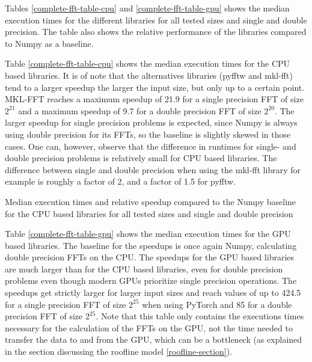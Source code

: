 \documentclass[english,11pt,a4paper,table]{article} %
\begin{document}
Tables \ref{complete-fft-table-cpu} and \ref{complete-fft-table-gpu} shows the median execution times for the different libraries for all tested sizes and single and double precision.
The table also shows the relative performance of the libraries compared to Numpy as a baseline.

Table \ref{complete-fft-table-cpu} shows the median execution times for the CPU based libraries.
It is of note that the alternatives libraries (pyfftw and mkl-fft) tend to a larger speedup the larger the input size, but only up to a certain point.
MKL-FFT reaches a maximum speedup of 21.9 for a single precision FFT of size $2^{21}$ and a maximum speedup of 9.7 for a double precision FFT of size $2^{20}$.
The larger speedup for single precision problems is expected, since Numpy is always using double precision for its FFTs, so the baseline is slightly skewed in those cases.
One can, however, observe that the difference in runtimes for single- and double precision problems is relatively small for CPU based libraries.
The difference between single and double precision when using the mkl-fft library for example is roughly a factor of 2, and a factor of 1.5 for pyfftw.

\begin{table}
	\centering
	\begin{footnotesize}
	
	\end{footnotesize}
	\caption{Median execution times and relative speedup compared to the Numpy baseline for the CPU based libraries for all tested sizes and single and double precision}
	\label{complete-fft-table-cpu}
\end{table}

Table \ref{complete-fft-table-gpu} shows the median execution times for the GPU based libraries.
The baseline for the speedups is once again Numpy, calculating double precision FFTs on the CPU.
The speedups for the GPU based libraries are much larger than for the CPU based libraries, even for double precision problems even though modern GPUs prioritize single precision operations.
The speedups get strictly larger for larger input sizes and reach values of up to 424.5 for a single precision FFT of size $2^{25}$ when using PyTorch and 85 for a double precision FFT of size $2^{25}$.
Note that this table only contains the executions times necessary for the calculation of the FFTs on the GPU, not the time needed to transfer the data to and from the GPU, which can be a bottleneck (as explained in the section discussing the roofline model \ref{roofline-section}).
\end{document}

